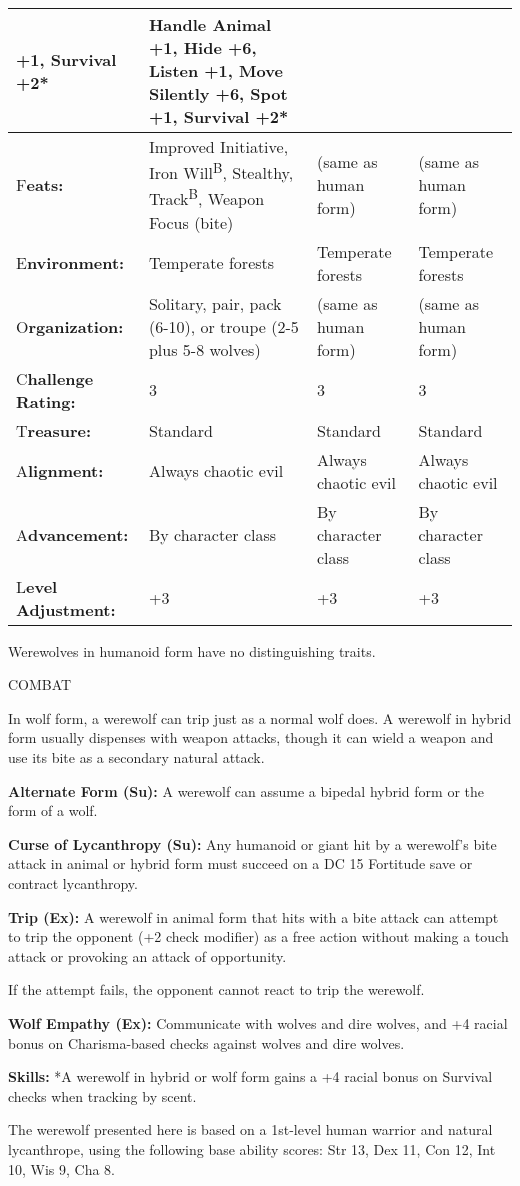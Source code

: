 \documentclass{article}
\begin{document}
\begin{tabular}{|>{\raggedright}p{50pt}|>{\raggedright}p{83pt}|>{\raggedright}p{84pt}|>{\raggedright}p{83pt}|}
+1, Survival +2* & Handle Animal +1, Hide +6, Listen +1, Move Silently +6, Spot 
+1, Survival +2*\tabularnewline
\hline
F\textbf{eats:} & Improved Initiative, Iron Will\textsuperscript{B}, Stealthy, 
Track\textsuperscript{B}, Weapon Focus (bite) & (same as human form) & (same as 
human form)\tabularnewline
\hline
E\textbf{nvironment:} & Temperate forests & Temperate forests & Temperate forests\tabularnewline
\hline
O\textbf{rganization:} & Solitary, pair, pack (6-10), or troupe (2-5 plus 5-8 wolves) & (same 
as human form) & (same as human form)\tabularnewline
\hline
C\textbf{hallenge Rating:} & 3 & 3 & 3\tabularnewline
\hline
T\textbf{reasure:} & Standard & Standard & Standard\tabularnewline
\hline
A\textbf{lignment:} & Always chaotic evil & Always chaotic evil & Always chaotic 
evil\tabularnewline
\hline
A\textbf{dvancement:} & By character class & By character class & By character 
class\tabularnewline
\hline
L\textbf{evel Adjustment:} & +3 & +3 & +3\tabularnewline
\hline
\end{tabular}

Werewolves in humanoid form have no distinguishing traits.

COMBAT

In wolf form, a werewolf can trip just as a normal wolf does. A werewolf in hybrid 
form usually dispenses with weapon attacks, though it can wield a weapon and use 
its bite as a secondary natural attack.

\textbf{Alternate Form (Su):} A werewolf can assume a bipedal hybrid form or the 
form of a wolf. 

\textbf{Curse of Lycanthropy (Su): }Any humanoid or giant hit by a werewolf's bite 
attack in animal or hybrid form must succeed on a DC 15 Fortitude save or contract 
lycanthropy.

\textbf{Trip (Ex):} A werewolf in animal form that hits with a bite attack can 
attempt to trip the opponent (+2 check modifier) as a free action without making 
a touch attack or provoking an attack of opportunity.

If the attempt fails, the opponent cannot react to trip the werewolf.

\textbf{Wolf Empathy (Ex):} Communicate with wolves and dire wolves, and +4 racial 
bonus on Charisma-based checks against wolves and dire wolves.

\textbf{Skills:} *A werewolf in hybrid or wolf form gains a +4 racial bonus on 
Survival checks when tracking by scent.

The werewolf presented here is based on a 1st-level human warrior and natural lycanthrope, 
using the following base ability scores: Str 13, Dex 11, Con 12, Int 10, Wis 9, 
Cha 8.
\end{document}
